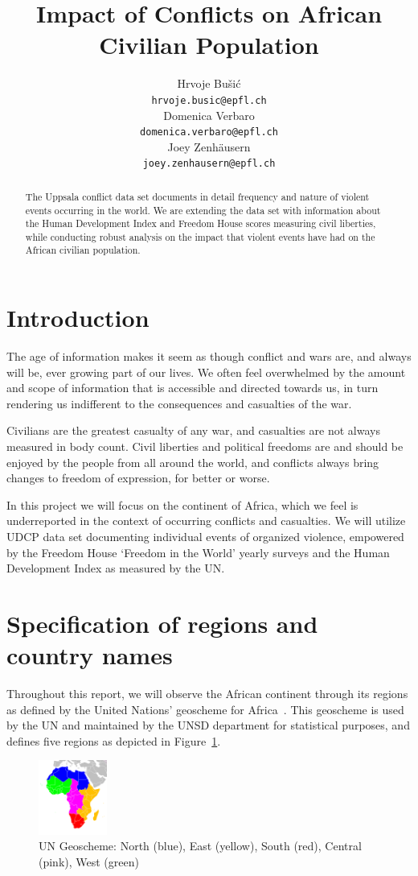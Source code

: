 \documentclass[a4paper,11pt]{article}
\title{Impact of Conflicts on African Civilian Population}
\author{Hrvoje Bušić \\
  \small{\tt hrvoje.busic@epfl.ch} \\\And
  Domenica Verbaro\\
  \small{\tt domenica.verbaro@epfl.ch} \\\And
Joey Zenhäusern\\
\small{\tt joey.zenhausern@epfl.ch} \\}
\date{}
\begin{document}
\maketitle
\begin{abstract}
The Uppsala conflict data set documents in detail frequency and nature of violent events occurring in the world. We are extending the data set with information about the Human Development Index and Freedom House scores measuring civil liberties, while conducting robust analysis on the impact that violent events have had on the African civilian population.
\end{abstract}

\section{Introduction}

The age of information makes it seem as though conflict and wars are, and always will be, ever growing part of our lives. We often feel overwhelmed by the amount and scope of information that is accessible and directed towards us, in turn rendering us indifferent to the consequences and casualties of the war.

Civilians are the greatest casualty of any war, and casualties are not always measured in body count. Civil liberties and political freedoms are and should be enjoyed by the people from all around the world, and conflicts always bring changes to freedom of expression, for better or worse.

In this project we will focus on the continent of Africa, which we feel is underreported in the context of occurring conflicts and casualties. We will utilize UDCP data set documenting individual events of organized violence, empowered by the Freedom House `Freedom in the World' yearly surveys and the Human Development Index as measured by the UN.

\section{Specification of regions and country
names}

Throughout this report, we will observe the African continent through its
regions as defined by the United Nations' geoscheme for Africa~\cite{UNGeoscheme}. This geoscheme is used by the UN and
maintained by the UNSD department for statistical purposes, and defines
five regions as depicted in Figure~\ref{fig:regions}.
\begin{figure}[ht!]
    \centering
    \includegraphics[width=0.2\textwidth]{images/Africa-regions.png}
    \caption{\footnotesize{UN Geoscheme: North (blue), East (yellow), South (red), Central (pink), West (green)\label{fig:regions}}}
\end{figure}
\end{document}
